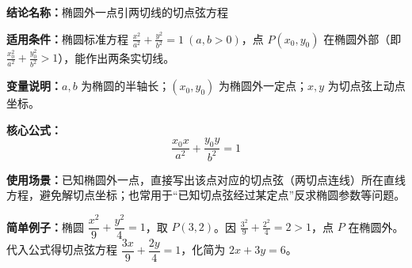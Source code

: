 \textbf{结论名称：}椭圆外一点引两切线的切点弦方程

\textbf{适用条件：}椭圆标准方程 $\frac{x^2}{a^2}+\frac{y^2}{b^2}=1\ (a,b>0)$，点 $P(x_0,y_0)$ 在椭圆外部（即 $\frac{x_0^2}{a^2}+\frac{y_0^2}{b^2}>1$），能作出两条实切线。

\textbf{变量说明：}$a,b$ 为椭圆的半轴长；$(x_0,y_0)$ 为椭圆外一定点；$x,y$ 为切点弦上动点坐标。

\textbf{核心公式：}
\[
\boxed{\frac{x_0x}{a^2}+\frac{y_0y}{b^2}=1}
\]

\textbf{使用场景：}已知椭圆外一点，直接写出该点对应的切点弦（两切点连线）所在直线方程，避免解切点坐标；也常用于“已知切点弦经过某定点”反求椭圆参数等问题。

\textbf{简单例子：}椭圆 $\dfrac{x^2}{9}+\dfrac{y^2}{4}=1$，取 $P(3,2)$。因 $\frac{3^2}{9}+\frac{2^2}{4}=2>1$，点 $P$ 在椭圆外。代入公式得切点弦方程 $\dfrac{3x}{9}+\dfrac{2y}{4}=1$，化简为 $2x+3y=6$。